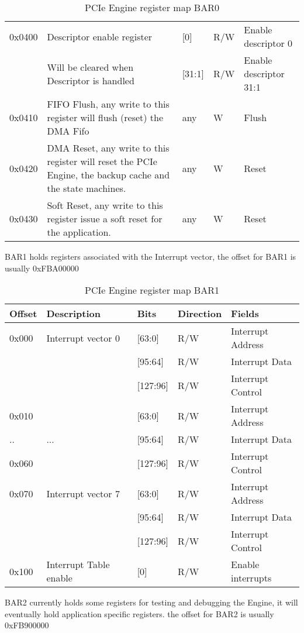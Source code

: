 \begin{table}[H]
\begin{tabularx}{\textwidth}{|l|X|l|l|l|}
	0x0400 & Descriptor enable register & [0] & R/W & Enable descriptor 0 \\
	& Will be cleared when Descriptor is handled& [31:1] & R/W & Enable descriptor 31:1\\
	\hline
	0x0410 & FIFO Flush, any write to this register will flush (reset) the DMA Fifo & any & W & Flush \\
	\hline
	0x0420 & DMA Reset, any write to this register will reset the PCIe Engine, the backup cache and the state machines. & any & W & Reset \\
	\hline
	0x0430 & Soft Reset, any write to this register issue a soft reset for the application. & any & W & Reset \\
	\hline	\end{tabularx}
	\caption{PCIe Engine register map BAR0}\label{tab:dma_register_map_bar0}
\end{table}
\newpage
BAR1 holds registers associated with the Interrupt vector, the offset for BAR1 is usually 0xFBA00000
\begin{table}[H]
	\centering
	\begin{tabularx}{\textwidth}{|l|X|l|l|l|}
	\hline
	\textbf{Offset} & \textbf{Description} &\textbf{Bits}&\textbf{Direction}& \textbf{Fields}\\
	\hline
	0x000 & Interrupt vector 0 & [63:0] & R/W & Interrupt Address \\
	      &                     & [95:64] & R/W & Interrupt Data \\
	      &                     & [127:96] & R/W & Interrupt Control\\
	\hline	
	0x010 &  & [63:0] & R/W & Interrupt Address \\
	.. & ... & [95:64] & R/W & Interrupt Data \\
	0x060 &  & [127:96] & R/W & Interrupt Control\\
	\hline	
	0x070 & Interrupt vector 7& [63:0] & R/W & Interrupt Address \\
		      &                & [95:64] & R/W & Interrupt Data \\
		      &                & [127:96] & R/W & Interrupt Control\\
	\hline	
	0x100 & Interrupt Table enable & [0] & R/W & Enable interrupts \\
	\hline
	\end{tabularx}
	\caption{PCIe Engine register map BAR1}\label{tab:dma_register_map_bar1}
\end{table}

BAR2 currently holds some registers for testing and debugging the Engine, it will eventually hold application specific registers. the offset for BAR2 is usually 0xFB900000

